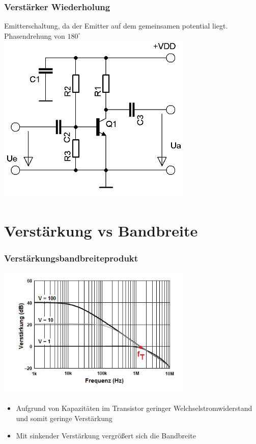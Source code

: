 \begin{frame}
  \frametitle{Verstärker Wiederholung}
  \begin{center}
    \large Emitterschaltung, da der Emitter auf dem gemeinsamen potential liegt.\\
    Phasendrehung von $180^{\circ}$\\
    \includegraphics[width=0.7\textwidth,height=.7\textheight,keepaspectratio]{a07/Transistor_Verstaerker_emetter.png}
  \end{center}
\end{frame}

\section*{Verstärkung vs Bandbreite}

\begin{frame}
  \frametitle{Verstärkungsbandbreiteprodukt}
  \begin{center}
    \includegraphics[width=0.7\textwidth,height=.6\textheight,keepaspectratio]{a07/Closed_loop_gain.png}
    {\tiny \hyperlink{refs}{\cite{wm}}} \\[2em]
    \begin{itemize}
      \item Aufgrund von Kapazitäten im Transistor geringer Welchselstromwiderstand und somit geringe Verstärkung
      \item Mit sinkender Verstärkung vergrößert sich die Bandbreite
    \end{itemize}
  \end{center}
\end{frame}

